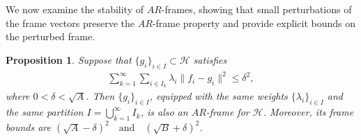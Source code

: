 \documentclass[12pt,titlepage]{amsart}
\newtheorem{prop}[thm]{Proposition}
\theoremstyle{definition}
\theoremstyle{remark}
\begin{document}
We now examine the stability of $AR$-frames, showing that small
perturbations of the frame vectors preserve the $AR$-frame
property and provide explicit bounds on the perturbed frame.
\begin{prop} \label{Prop.2}
Suppose that $\{g_i\}_{i\in I}\subset\mathcal H$
satisfies
\begin{eqnarray*}
\sum_{k=1}^{\infty}\sum_{i\in I_k} \lambda_i\|f_i-g_i\|^2 \le
\delta^2,
\end{eqnarray*}
where $0<\delta<\sqrt A$. Then $\{g_i\}_{i\in I}$, equipped with
the same weights $\{\lambda_i\}_{i\in I}$ and the same partition
$I=\bigcup_{k=1}^{\infty}I_k$, is also an $AR$-frame for $\mathcal
H$. Moreover, its frame bounds are $(\sqrt A-\delta)^2
\quad\text{and}\quad (\sqrt B+\delta)^2$.
\end{prop}
\end{document}
